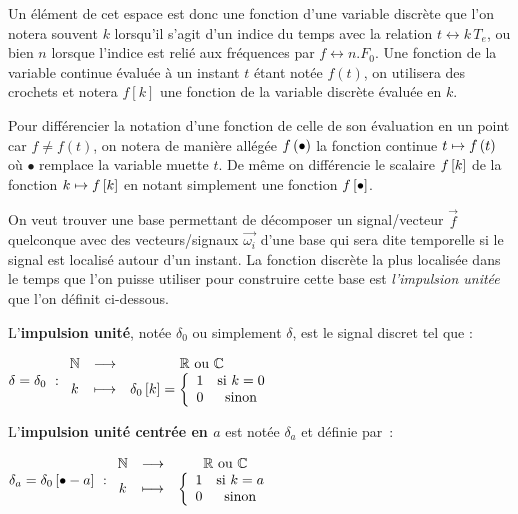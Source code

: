 \begin{remarque}
Un élément de cet espace est donc une fonction d'une variable discrète
que l'on notera souvent $k$ lorsqu'il s'agit d'un indice du temps avec
la relation $t \leftrightarrow k\,T_e$, ou bien $n$ lorsque l'indice
est relié aux fréquences par $f \leftrightarrow n.F_0$. Une fonction
de la variable continue évaluée à un instant $t$ étant notée $f(t)$,
on utilisera des crochets et notera $f[k]$ une fonction de la variable
discrète évaluée en $k$.

Pour différencier la notation d'une fonction de celle de son
évaluation en un point car $f\neq f(t)$, on notera de manière allégée
$f\left(\bullet\right)$ la fonction continue $t\mapsto f\left(t\right)$ où $\bullet$
remplace la variable muette $t$. De même on différencie le scalaire
$f\left[k\right]$ de la fonction $k\mapsto f\left[k\right]$ en notant simplement une
fonction $f\left[\bullet\right]$.
\end{remarque}
On veut trouver une base permettant de décomposer un signal/vecteur
$\vec{f}$ quelconque avec des vecteurs/signaux $\vec{\omega_i}$ d'une
base qui sera dite temporelle si le signal est localisé autour d'un
instant. La fonction discrète la plus localisée dans le temps que l'on
puisse utiliser pour construire cette base est \emph{l'impulsion
  unitée} que l'on définit ci-dessous.
\begin{definition}
  \label{def:impulsion_unite}
  L'\textbf{impulsion unité}, notée $\delta_0$ ou simplement $\delta$,
  est le signal discret tel que :


  \begin{minipage}[l]{0.5\linewidth}
  $ \delta=\delta_0~:\begin{array}{ccc} \mathbb{N} & \longrightarrow & \mathbb{R} \text{ ou } \mathbb{C} \\  k & \longmapsto & \delta_0\left[k\right]=\left\{\begin{array}{cc} {1} & {\text{si } k=0}\\ {0} & {\text{sinon}}\\ \end{array}\right. \\ \end{array} $
\end{minipage}
\begin{minipage}[l]{0.5\linewidth}
\end{minipage}


L'\textbf{impulsion unité centrée en $a$} est notée $\delta_a$ et définie par~:


\begin{minipage}[l]{0.5\linewidth}
$\delta_a = \delta_0\left[\bullet-a\right]~: \begin{array}{ccc} \mathbb{N} & \longrightarrow & \mathbb{R} \text{ ou } \mathbb{C} \\ k & \longmapsto & \left\{\begin{array}{cc} {1} & {\text{si } k=a}\\ {0} & {\text{sinon}}\\ \end{array}\right. \\ \end{array}$ 
\end{minipage}
\begin{minipage}[l]{0.5\linewidth}
\end{minipage}
\end{definition}

